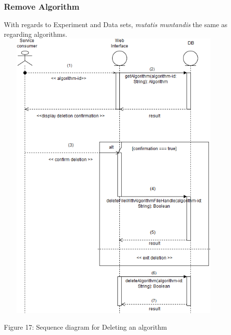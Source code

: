     \subsubsection{Remove Algorithm}
    \par With regards to Experiment and Data sets,
    { \textit{mutatis muntandis} the same as regarding algorithms.} \newline \newline
    \includegraphics[width=12cm,height=15cm,keepaspectratio]{input_unit/images/delete_algorithm_sequence_diagram.png}
    \begin{center}
    	\small{Figure 17: Sequence diagram for Deleting an algorithm }
    \end{center}
    \newpage
